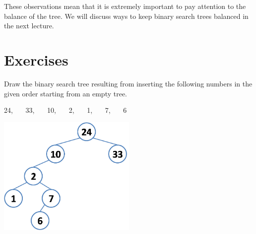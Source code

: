 These observations mean that it is extremely important to pay
attention to the balance of the tree.  We will discuss ways
to keep binary search trees balanced in the next lecture.

\clearpage
\section{Exercises}
\label{sec:bst:exercises}

\begin{flex}
\begin{exercise}
\label{ex:bst-insert-24-33-10-2-1-7-6}
  Draw the binary search tree resulting from inserting the following
  numbers in the given order starting from an empty tree.
  \begin{center}
    24, \ \ \ 33, \ \ \ 10, \ \ \ 2, \ \ \ 1, \ \ \ 7, \ \ \ 6
  \end{center}
\end{exercise}

\begin{solution}
\label{ex:bst-insert-24-33-10-2-1-7-6-solved}
\begin{center}
  \includegraphics[width=0.5\textwidth]{img/bst-ex1.png}
\end{center}
\end{solution}
\end{flex}


